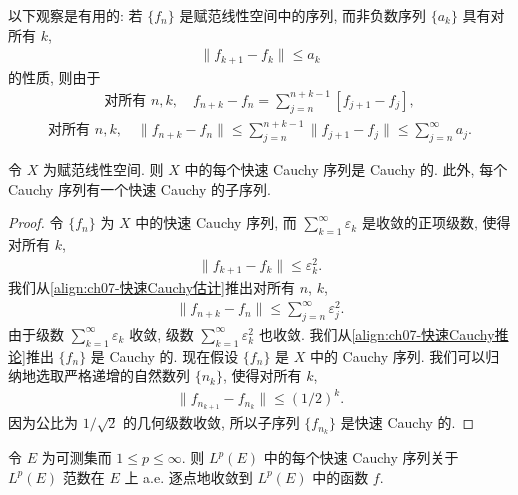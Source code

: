 \documentclass[../../main.tex]{subfiles}
\begin{document}
以下观察是有用的: 若 $\{f_{n}\}$ 是赋范线性空间中的序列, 而非负数序列 $\{a_{k}\}$ 具有对所有 $k$,
\begin{align*}
\|f_{k+1}-f_{k}\|\leqslant a_{k}
\end{align*}
的性质, 则由于
\begin{align*}
\text{对所有 }n,k,\quad f_{n+k}-f_{n}=\sum_{j=n}^{n+k-1}[f_{j+1}-f_{j}],
\end{align*}
\begin{align}
\text{对所有 }n,k,\quad\|f_{n+k}-f_{n}\|\leqslant\sum_{j=n}^{n+k-1}\|f_{j+1}-f_{j}\|\leqslant\sum_{j=n}^{\infty}a_{j}.\label{align:ch07-快速Cauchy估计}
\end{align}

\begin{proposition}\label{proposition:ch07-快速Cauchy}
令 $X$ 为赋范线性空间. 则 $X$ 中的每个快速 Cauchy 序列是 Cauchy 的. 此外, 每个 Cauchy 序列有一个快速 Cauchy 的子序列.
\end{proposition}

\begin{proof}
令 $\{f_{n}\}$ 为 $X$ 中的快速 Cauchy 序列, 而 $\sum_{k=1}^{\infty}\varepsilon_{k}$ 是收敛的正项级数, 使得对所有 $k$,
\begin{align}
\|f_{k+1}-f_{k}\|\leqslant\varepsilon_{k}^{2}.\label{align:ch07-快速Cauchy条件}
\end{align}
我们从\eqref{align:ch07-快速Cauchy估计}推出对所有 $n$, $k$,
\begin{align}
\|f_{n+k}-f_{n}\|\leqslant\sum_{j=n}^{\infty}\varepsilon_{j}^{2}.\label{align:ch07-快速Cauchy推论}
\end{align}
由于级数 $\sum_{k=1}^{\infty}\varepsilon_{k}$ 收敛, 级数 $\sum_{k=1}^{\infty}\varepsilon_{k}^{2}$ 也收敛. 我们从\eqref{align:ch07-快速Cauchy推论}推出 $\{f_{n}\}$ 是 Cauchy 的. 现在假设 $\{f_{n}\}$ 是 $X$ 中的 Cauchy 序列. 我们可以归纳地选取严格递增的自然数列 $\{n_{k}\}$, 使得对所有 $k$,
\begin{align*}
\|f_{n_{k+1}}-f_{n_{k}}\|\leqslant(1/2)^{k}.
\end{align*}
因为公比为 $1/\sqrt{2}$ 的几何级数收敛, 所以子序列 $\{f_{n_{k}}\}$ 是快速 Cauchy 的.
\end{proof}

\begin{theorem}\label{theorem:ch07-快速Cauchy逐点收敛}
令 $E$ 为可测集而 $1\leqslant p\leqslant\infty$. 则 $L^{p}(E)$ 中的每个快速 Cauchy 序列关于 $L^{p}(E)$ 范数在 $E$ 上 a.e. 逐点地收敛到 $L^{p}(E)$ 中的函数 $f$.
\end{theorem}
\end{document}
